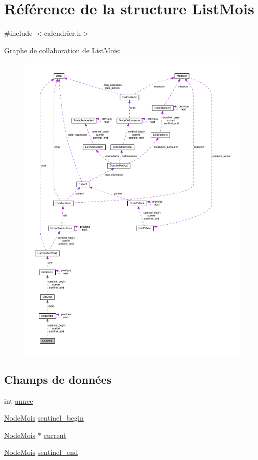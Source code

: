 \hypertarget{struct_list_mois}{\section{Référence de la structure List\-Mois}
\label{struct_list_mois}
}


{\ttfamily \#include $<$calendrier.\-h$>$}



Graphe de collaboration de List\-Mois\-:
\nopagebreak
\begin{figure}[H]
\begin{center}
\leavevmode
\includegraphics[width=350pt]{struct_list_mois__coll__graph}
\end{center}
\end{figure}
\subsection*{Champs de données}
\begin{DoxyCompactItemize}
\item 
int \hyperlink{struct_list_mois_acfe2ff64f5396827db36f1575c5e99d8}{annee}
\item 
\hyperlink{struct_node_mois}{Node\-Mois} \hyperlink{struct_list_mois_a348d32e033fef5b956bbd0470f22a50c}{sentinel\-\_\-begin}
\item 
\hyperlink{struct_node_mois}{Node\-Mois} $\ast$ \hyperlink{struct_list_mois_a5b776be43208a3cfeec9d21bf0fe0624}{current}
\item 
\hyperlink{struct_node_mois}{Node\-Mois} \hyperlink{struct_list_mois_abcefbcec0ea15d4123448b26256468fe}{sentinel\-\_\-end}
\end{DoxyCompactItemize}


